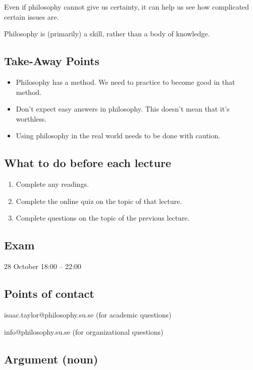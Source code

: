 Even if philosophy cannot give us certainty, it can help us see how
complicated certain issues are.

Philosophy is (primarily) a skill, rather than a body of knowledge.

\subsection{Take-Away Points}

\begin{itemize}
    \item Philosophy has a method. We need to practice to become good in
        that method.
    \item Don't expect easy answers in philosophy. This doesn't mean that
        it's worthless.
    \item Using philosophy in the real world needs to be done with caution.
\end{itemize}

\subsection{What to do before each lecture}
\begin{enumerate}
    \item Complete any readings.
    \item Complete the online quiz on the topic of that lecture.
    \item Complete questions on the topic of the previous lecture.
\end{enumerate}

\subsection{Exam}

28 October 18:00 -- 22:00

\subsection{Points of contact}

isaac.taylor@philosophy.su.se (for academic questions)

info@philosophy.su.se (for organizational questions)

\subsection{Argument (noun)}


